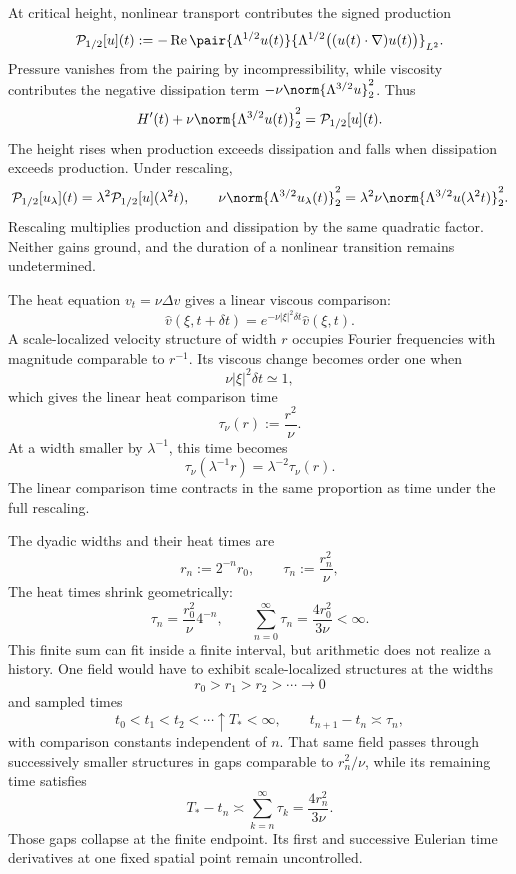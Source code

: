At critical height, nonlinear transport contributes the signed production
\[
  \mathcal P_{1/2}[u](t)
  :=
  -\operatorname{Re}
  \pair
    {\Lambda^{1/2}u(t)}
    {\Lambda^{1/2}\bigl((u(t)\cdot\nabla)u(t)\bigr)}_{L^2}.
\]
Pressure vanishes from the pairing by incompressibility, while viscosity contributes the negative dissipation term \(-\nu\norm{\Lambda^{3/2}u}_2^2\). Thus
\[
  H'(t)
  +
  \nu\norm{\Lambda^{3/2}u(t)}_2^2
  =
  \mathcal P_{1/2}[u](t).
\]
The height rises when production exceeds dissipation and falls when dissipation exceeds production. Under rescaling,
\[
  \mathcal P_{1/2}[u_\lambda](t)
  =
  \lambda^2\mathcal P_{1/2}[u](\lambda^2t),
  \qquad
  \nu\norm{\Lambda^{3/2}u_\lambda(t)}_2^2
  =
  \lambda^2\nu\norm{\Lambda^{3/2}u(\lambda^2t)}_2^2.
\]
Rescaling multiplies production and dissipation by the same quadratic factor. Neither gains ground, and the duration of a nonlinear transition remains undetermined.


The heat equation \(v_t=\nu\Delta v\) gives a linear viscous comparison:
\[
  \widehat v(\xi,t+\delta t)
  =
  e^{-\nu|\xi|^2\delta t}\widehat v(\xi,t).
\]
A scale-localized velocity structure of width \(r\) occupies Fourier frequencies with magnitude comparable to \(r^{-1}\). Its viscous change becomes order one when
\[
  \nu|\xi|^2\delta t\simeq1,
\]
which gives the linear heat comparison time
\[
  \tau_\nu(r)
  :=
  \frac{r^2}{\nu}.
\]
At a width smaller by \(\lambda^{-1}\), this time becomes
\[
  \tau_\nu(\lambda^{-1}r)
  =
  \lambda^{-2}\tau_\nu(r).
\]
The linear comparison time contracts in the same proportion as time under the full \NavierStokes{} rescaling.


The dyadic widths and their heat times are
\[
  r_n:=2^{-n}r_0,
  \qquad
  \tau_n:=\frac{r_n^2}{\nu},
\]
The heat times shrink geometrically:
\[
  \tau_n
  =
  \frac{r_0^2}{\nu}4^{-n},
  \qquad
  \sum_{n=0}^{\infty}\tau_n
  =
  \frac{4r_0^2}{3\nu}
  <
  \infty.
\]
This finite sum can fit inside a finite interval, but arithmetic does not realize a history. One \NavierStokes{} field would have to exhibit scale-localized structures at the widths
\[
  r_0>r_1>r_2>\cdots\longrightarrow0
\]
and sampled times
\[
  t_0<t_1<t_2<\cdots\uparrow T_*<\infty,
  \qquad
  t_{n+1}-t_n\asymp\tau_n,
\]
with comparison constants independent of \(n\). That same field passes through successively smaller structures in gaps comparable to \(r_n^2/\nu\), while its remaining time satisfies
\[
  T_*-t_n
  \asymp
  \sum_{k=n}^{\infty}\tau_k
  =
  \frac{4r_n^2}{3\nu}.
\]
Those gaps collapse at the finite endpoint. Its first and successive Eulerian time derivatives at one fixed spatial point remain uncontrolled.
